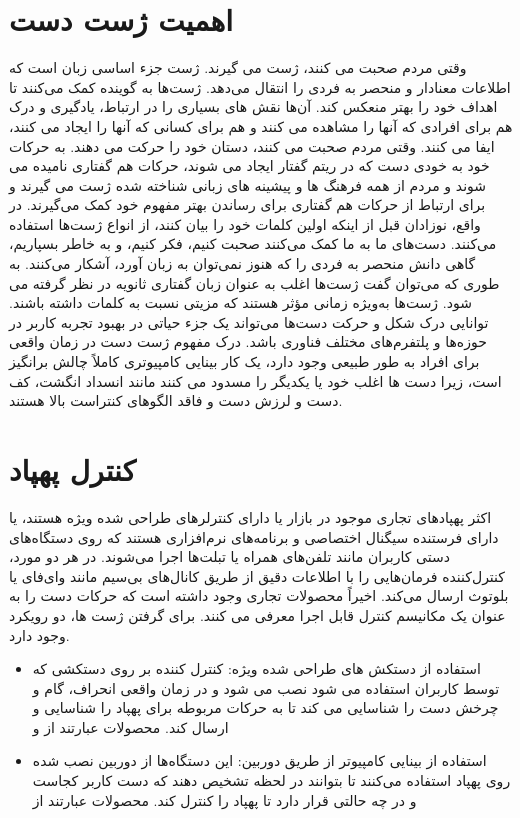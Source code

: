 \section{اهمیت ژست دست}
وقتی مردم صحبت می کنند، ژست می گیرند. ژست جزء اساسی زبان است که اطلاعات معنادار و منحصر به فردی را انتقال می‌دهد. ژست‌ها به گوینده کمک می‌کنند تا اهداف خود را بهتر منعکس کند. 
آن‌‌ها نقش های بسیاری را در ارتباط، یادگیری و درک هم برای افرادی که آنها را مشاهده می کنند و هم برای کسانی که آنها را ایجاد می کنند، ایفا می کنند.
وقتی مردم صحبت می کنند، دستان خود را حرکت می دهند. به حرکات خود به خودی دست که در ریتم گفتار ایجاد می شوند، حرکات هم گفتاری 
نامیده می شوند و مردم از همه فرهنگ ها و پیشینه های زبانی شناخته شده ژست می گیرند و برای ارتباط از حرکات هم گفتاری برای رساندن بهتر مفهوم خود کمک می‌گیرند.
در واقع، نوزادان قبل از اینکه اولین کلمات خود را بیان کنند، از انواع ژست‌ها استفاده می‌کنند. دست‌های ما به ما کمک می‌کنند صحبت کنیم، فکر کنیم، و به خاطر بسپاریم، گاهی دانش
منحصر به فردی را که هنوز نمی‌توان به زبان آورد، آشکار می‌کنند. به طوری که می‌توان گفت ژست‌ها اغلب به عنوان زبان گفتاری ثانویه در نظر گرفته می شود.\cite{clough2020role}
ژست‌ها به‌ویژه زمانی مؤثر هستند که مزیتی نسبت به کلمات داشته باشند. \cite{kang2016hands}
توانایی درک شکل و حرکت دست‌ها می‌تواند یک جزء حیاتی در بهبود تجربه کاربر  
در حوزه‌ها و پلتفرم‌های مختلف فناوری باشد. درک مفهوم ژست دست در زمان واقعی برای افراد به طور طبیعی وجود دارد، یک کار بینایی 
کامپیوتری کاملاً چالش برانگیز است، زیرا دست ها اغلب خود یا یکدیگر را مسدود می کنند مانند انسداد انگشت، کف دست و لرزش دست و فاقد الگوهای کنتراست بالا هستند.\cite{zhang2020mediapipe}

\section{کنترل پهپاد}
اکثر پهپادهای تجاری موجود در بازار یا دارای کنترلرهای طراحی شده ویژه هستند، یا دارای فرستنده سیگنال اختصاصی و برنامه‌های نرم‌افزاری هستند که روی دستگاه‌های دستی کاربران 
مانند تلفن‌های همراه یا تبلت‌ها اجرا می‌شوند. در هر دو مورد، کنترل‌کننده فرمان‌هایی را با اطلاعات دقیق از طریق کانال‌های بی‌سیم مانند 
وای‌فای یا بلوتوث ارسال می‌کند. اخیراً محصولات تجاری وجود داشته است که حرکات دست را به عنوان یک مکانیسم کنترل قابل اجرا معرفی می کنند. برای گرفتن ژست ها، دو رویکرد وجود دارد.
\begin{itemize}
    \item	استفاده از دستکش های طراحی شده ویژه: کنترل کننده بر روی دستکشی که توسط کاربران استفاده می شود نصب می شود و در زمان واقعی انحراف، گام و چرخش دست را شناسایی می کند 
    تا به حرکات مربوطه برای پهپاد را شناسایی و ارسال کند. محصولات عبارتند از  و 
    \item 	استفاده از بینایی کامپیوتر از طریق دوربین: این دستگاه‌ها از دوربین نصب شده روی پهپاد استفاده می‌کنند تا بتوانند در لحظه تشخیص دهند که دست کاربر کجاست
    و در چه حالتی قرار دارد تا پهپاد را کنترل کند. محصولات عبارتند از  
\end{itemize}



